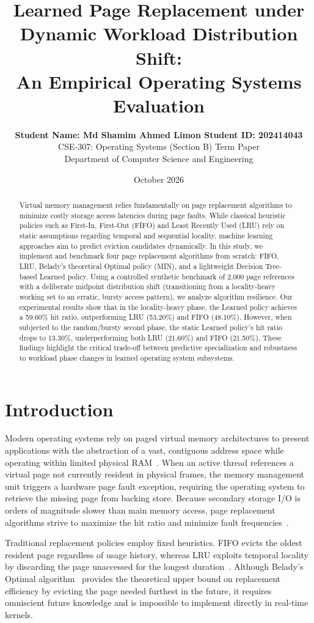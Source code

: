 \documentclass[10pt,twocolumn,a4paper]{article}
\title{\textbf{Learned Page Replacement under Dynamic Workload Distribution Shift:\\An Empirical Operating Systems Evaluation}}
\author{
    \textbf{Student Name: Md Shamim Ahmed Limon \quad Student ID: 202414043}\\
    CSE-307: Operating Systems (Section B) Term Paper\\
    Department of Computer Science and Engineering
}
\date{October 2026}
\begin{document}
\maketitle

\begin{abstract}
Virtual memory management relies fundamentally on page replacement algorithms to minimize costly storage access latencies during page faults. While classical heuristic policies such as First-In, First-Out (FIFO) and Least Recently Used (LRU) rely on static assumptions regarding temporal and sequential locality, machine learning approaches aim to predict eviction candidates dynamically. In this study, we implement and benchmark four page replacement algorithms from scratch: FIFO, LRU, Belady's theoretical Optimal policy (MIN), and a lightweight Decision Tree-based Learned policy. Using a controlled synthetic benchmark of 2,000 page references with a deliberate midpoint distribution shift (transitioning from a locality-heavy working set to an erratic, bursty access pattern), we analyze algorithm resilience. Our experimental results show that in the locality-heavy phase, the Learned policy achieves a 59.60\% hit ratio, outperforming LRU (53.20\%) and FIFO (48.10\%). However, when subjected to the random/bursty second phase, the static Learned policy's hit ratio drops to 13.30\%, underperforming both LRU (21.60\%) and FIFO (21.50\%). These findings highlight the critical trade-off between predictive specialization and robustness to workload phase changes in learned operating system subsystems.
\end{abstract}

\section{Introduction}
Modern operating systems rely on paged virtual memory architectures to present applications with the abstraction of a vast, contiguous address space while operating within limited physical RAM~\cite{silberschatz2018operating}. When an active thread references a virtual page not currently resident in physical frames, the memory management unit triggers a hardware page fault exception, requiring the operating system to retrieve the missing page from backing store. Because secondary storage I/O is orders of magnitude slower than main memory access, page replacement algorithms strive to maximize the hit ratio and minimize fault frequencies~\cite{denning1968working}.

Traditional replacement policies employ fixed heuristics. FIFO evicts the oldest resident page regardless of usage history, whereas LRU exploits temporal locality by discarding the page unaccessed for the longest duration~\cite{silberschatz2018operating}. Although Belady's Optimal algorithm~\cite{belady1966study} provides the theoretical upper bound on replacement efficiency by evicting the page needed furthest in the future, it requires omniscient future knowledge and is impossible to implement directly in real-time kernels.
\end{document}
